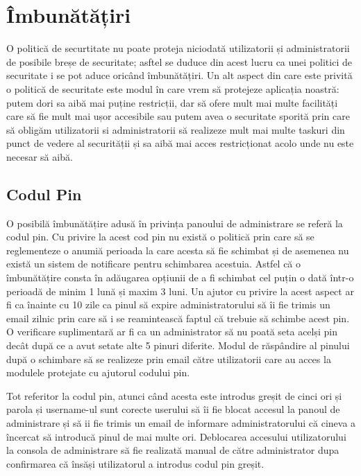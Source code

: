 \chapter{Îmbunătățiri}

O politică de securtitate nu poate proteja niciodată utilizatorii și administratorii de posibile breșe de securitate; asftel se duduce din acest lucru ca unei politici de securitate i se pot aduce oricând îmbunătățiri. Un alt aspect din care este privită o politică de securitate este modul în care vrem să protejeze aplicația noastră: putem dori sa aibă mai puține restricții, dar să ofere mult mai multe facilități care să fie mult mai ușor accesibile sau putem avea o securitate sporită prin care să obligăm utilizatorii si administratorii să realizeze mult mai multe taskuri din punct de vedere al securității și sa aibă mai acces restricționat acolo unde nu este necesar să aibă.

\section{Codul Pin}

O posibilă îmbunătățire adusă în privința panoului de administrare se referă la codul pin. Cu privire la acest cod pin nu există o politică prin care să se reglementeze o anumiă perioada la care acesta să fie schimbat și de asemenea nu există un sistem de notificare pentru schimbarea acestuia. Astfel că o îmbunătățire consta în adăugarea opțiunii de a fi schimbat cel puțin o dată într-o perioadă de minim 1 lună și maxim 3 luni. Un ajutor cu privire la acest aspect ar fi ca înainte cu 10 zile ca pinul să expire administratorului să îi fie trimis un email zilnic prin care să i se reamintească faptul că trebuie să schimbe acest pin. O verificare suplimentară ar fi ca un administrator să nu poată seta acelși pin decât după ce a avut setate alte 5 pinuri diferite. Modul de răspândire al pinului după o schimbare să se realizeze prin email către utilizatorii care au acces la modulele protejate cu ajutorul codului pin. 

Tot referitor la codul pin, atunci când acesta este introdus greșit de cinci ori și parola și username-ul sunt corecte userului să îi fie blocat accesul la panoul de administrare și să ii fie trimis un email de informare administratorului că cineva a încercat să introducă pinul de mai multe ori. Deblocarea accesului utilizatorului la consola de administrare să fie realizată manual de către administrator dupa confirmarea că însăși utilizatorul a introdus codul pin greșit. 

